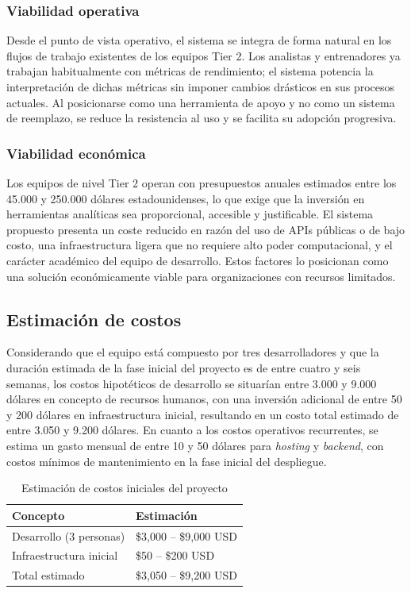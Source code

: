 \documentclass{ULBreport} %
\begin{document}
\subsubsection{Viabilidad operativa}

Desde el punto de vista operativo, el sistema se integra de forma natural en los flujos de trabajo existentes de los equipos Tier 2. Los analistas y entrenadores ya trabajan habitualmente con métricas de rendimiento; el sistema potencia la interpretación de dichas métricas sin imponer cambios drásticos en sus procesos actuales. Al posicionarse como una herramienta de apoyo y no como un sistema de reemplazo, se reduce la resistencia al uso y se facilita su adopción progresiva.

\subsubsection{Viabilidad económica}

Los equipos de nivel Tier 2 operan con presupuestos anuales estimados entre los 45.000 y 250.000 dólares estadounidenses, lo que exige que la inversión en herramientas analíticas sea proporcional, accesible y justificable. El sistema propuesto presenta un coste reducido en razón del uso de APIs públicas o de bajo costo, una infraestructura ligera que no requiere alto poder computacional, y el carácter académico del equipo de desarrollo. Estos factores lo posicionan como una solución económicamente viable para organizaciones con recursos limitados.

\subsection{Estimación de costos}

Considerando que el equipo está compuesto por tres desarrolladores y que la duración estimada de la fase inicial del proyecto es de entre cuatro y seis semanas, los costos hipotéticos de desarrollo se situarían entre 3.000 y 9.000 dólares en concepto de recursos humanos, con una inversión adicional de entre 50 y 200 dólares en infraestructura inicial, resultando en un costo total estimado de entre 3.050 y 9.200 dólares. En cuanto a los costos operativos recurrentes, se estima un gasto mensual de entre 10 y 50 dólares para \textit{hosting} y \textit{backend}, con costos mínimos de mantenimiento en la fase inicial del despliegue.

\begin{table}[H]
    \centering
    \caption{Estimación de costos iniciales del proyecto}
    \label{tab:costos}
    \begin{tabular}{|l|l|}
        \hline
        \textbf{Concepto} & \textbf{Estimación} \\ \hline
        Desarrollo (3 personas) & \$3,000 -- \$9,000 USD \\ \hline
        Infraestructura inicial & \$50 -- \$200 USD \\ \hline
        Total estimado & \$3,050 -- \$9,200 USD \\ \hline
    \end{tabular}
\end{table}
\end{document}
